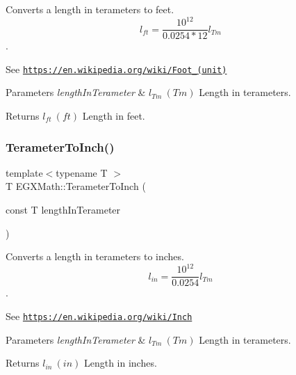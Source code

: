 Converts a length in terameters to feet. \[ l_{ft}= \frac{10^{12}}{0.0254 * 12} l_{Tm} \]. 

See \href{https://en.wikipedia.org/wiki/Foot_(unit)}{\tt https\+://en.\+wikipedia.\+org/wiki/\+Foot\+\_\+(unit)} 
\begin{DoxyParams}{Parameters}
{\em length\+In\+Terameter} & $ l_{Tm}\ (Tm)$ Length in terameters. \\
\hline
\end{DoxyParams}
\begin{DoxyReturn}{Returns}
$ l_{ft}\ (ft)$ Length in feet. 
\end{DoxyReturn}
\mbox{\label{group___e_g_x_math-_conversions-_length_conversions-_s_i-_terameter-_imperial_ga85c9ddc82ba02c1fea0b22b896fed936}} 
\subsubsection{\texorpdfstring{Terameter\+To\+Inch()}{TerameterToInch()}}
{\footnotesize\ttfamily template$<$typename T $>$ \\
T E\+G\+X\+Math\+::\+Terameter\+To\+Inch (\begin{DoxyParamCaption}\item[{const T}]{length\+In\+Terameter }\end{DoxyParamCaption})}



Converts a length in terameters to inches. \[ l_{in}= \frac{10^{12}}{0.0254} l_{Tm} \]. 

See \href{https://en.wikipedia.org/wiki/Inch}{\tt https\+://en.\+wikipedia.\+org/wiki/\+Inch} 
\begin{DoxyParams}{Parameters}
{\em length\+In\+Terameter} & $ l_{Tm}\ (Tm)$ Length in terameters. \\
\hline
\end{DoxyParams}
\begin{DoxyReturn}{Returns}
$ l_{in}\ (in)$ Length in inches. 
\end{DoxyReturn}
\mbox{\label{group___e_g_x_math-_conversions-_length_conversions-_s_i-_terameter-_imperial_ga9ae6fa58a9800d91e89f76e68838fa86}} 
